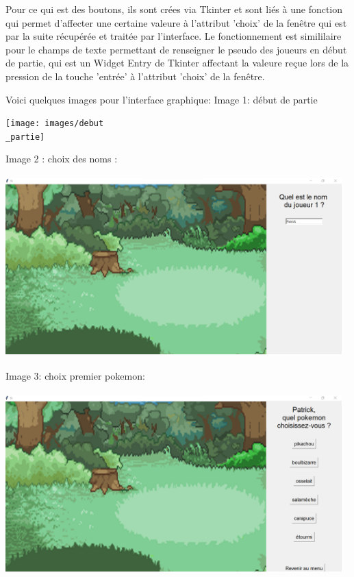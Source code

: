             \bigskip

            Pour ce qui est des boutons, ils sont crées via Tkinter et sont liés à une fonction qui permet d'affecter une certaine valeure à l'attribut 'choix' de la fenêtre qui est par la suite récupérée et traitée par l'interface. Le fonctionnement est simililaire pour le champs de texte permettant de renseigner le pseudo des joueurs en début de partie, qui est un Widget Entry de Tkinter affectant la valeure reçue lors de la pression de la touche 'entrée' à l'attribut 'choix' de la fenêtre.

            Voici quelques images pour l'interface graphique:
            Image 1: début de partie
        
            \texttt{[image: images/debut\\\_partie]}
            
            Image 2 : choix des noms :
            
            \includegraphics[width=13cm,height=7cm]{images/nom}
            
            Image 3: choix premier pokemon:
            
            \includegraphics[width=13cm,height=7cm]{images/choix1}
            
